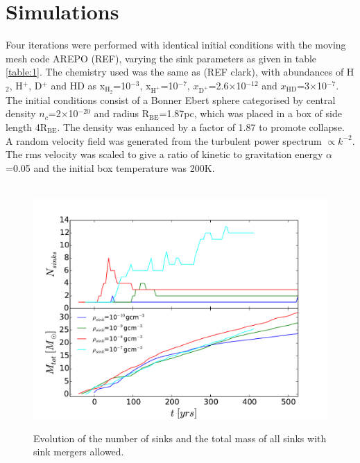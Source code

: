 \documentclass[fleqn,usenatbib]{mnras}
\begin{document}
\section{Simulations}
Four iterations were performed with identical initial conditions with the moving mesh code AREPO (REF), varying the sink parameters as given in table \ref{table:1}. The chemistry used was the same as (REF clark), with abundances of H$_2$, H$^{+}$, D$^{+}$ and HD as x$_{\text{H}_{2}}$=10$^{-3}$, x$_{\text{H}^{+}}$=10$^{-7}$, $x_{\text{D}^{+}}$=2.6$\times$10$^{-12}$ and $x_{\text{HD}}$=3$\times$10$^{-7}$. The initial conditions consist of a Bonner Ebert sphere categorised by central density $n_c$=2$\times$10$^{-20}$ and radius R$_{\text{BE}}$=1.87pc, which was placed in a box of side length 4R$_{\text{BE}}$. The density was enhanced by a factor of 1.87 to promote collapse. A random velocity field was generated from the turbulent power spectrum $\propto k^{-2}$. The rms velocity was scaled to give a ratio of kinetic to gravitation energy $\alpha$=0.05 and the initial box temperature was 200K.

\begin{figure}
	\hbox{\hspace{-0.8cm} \includegraphics[scale=0.5]{sink_mergers_zoom.pdf}}
    \caption{Evolution of the number of sinks and the total mass of all sinks with sink mergers allowed.}
    \label{fig:example_figure}
\end{figure}
\end{document}
